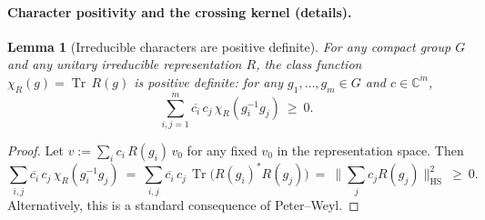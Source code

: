 \documentclass[11pt]{amsart}
\theoremstyle{plain}
\newtheorem{lemma}[theorem]{Lemma}
\theoremstyle{definition}
\theoremstyle{remark}
\begin{document}
\paragraph{Character positivity and the crossing kernel (details).}
\begin{lemma}[Irreducible characters are positive definite]\label{lem:char-pd}
For any compact group $G$ and any unitary irreducible representation $R$, the class function $\chi_R(g)=\operatorname{Tr}\,R(g)$ is positive definite: for any $g_1,\dots,g_m\in G$ and $c\in\mathbb C^m$,
\[
  \sum_{i,j=1}^m \overline{c_i}\,c_j\,\chi_R(g_i^{-1} g_j)\ \ge\ 0.
\]
\end{lemma}
\begin{proof}
Let $v:=\sum_i c_i\,R(g_i)\,v_0$ for any fixed $v_0$ in the representation space. Then
\[
  \sum_{i,j}\overline{c_i}\,c_j\,\chi_R(g_i^{-1} g_j)\ =\ \sum_{i,j}\overline{c_i}\,c_j\,\operatorname{Tr}\big(R(g_i)^{*}R(g_j)\big)\ =\ \|\sum_j c_j R(g_j)\|_{\mathrm{HS}}^2\ \ge\ 0.
\]
Alternatively, this is a standard consequence of Peter–Weyl.
\end{proof}
\end{document}
